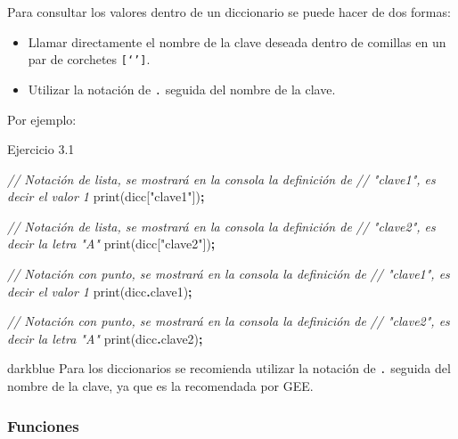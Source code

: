 \documentclass[
  12pt,
  letterpaper,
  twoside]{book}
\newenvironment{Shaded}{\begin{snugshade}}{\end{snugshade}}
\newcommand{\AttributeTok}[1]{\textcolor[rgb]{0.77,0.63,0.00}{#1}}
\newcommand{\CommentTok}[1]{\textcolor[rgb]{0.56,0.35,0.01}{\textit{#1}}}
\newcommand{\FunctionTok}[1]{\textcolor[rgb]{0.00,0.00,0.00}{#1}}
\newcommand{\NormalTok}[1]{#1}
\newcommand{\OperatorTok}[1]{\textcolor[rgb]{0.81,0.36,0.00}{\textbf{#1}}}
\newcommand{\StringTok}[1]{\textcolor[rgb]{0.31,0.60,0.02}{#1}}
\providecommand{\tightlist}{%
  \setlength{\itemsep}{0pt}\setlength{\parskip}{0pt}}
\begin{document}
Para consultar los valores dentro de un diccionario se puede hacer de dos formas:

\begin{itemize}
\tightlist
\item
  Llamar directamente el nombre de la clave deseada dentro de comillas en un par de corchetes \texttt{{[}‘’{]}}.
\item
  Utilizar la notación de \texttt{.} seguida del nombre de la clave.
\end{itemize}

Por ejemplo:

Ejercicio 3.1

\begin{Shaded}
\begin{Highlighting}[]
\CommentTok{// Notación de lista, se mostrará en la consola la definición de }
\CommentTok{// "clave1", es decir el valor 1 }
\FunctionTok{print}\NormalTok{(dicc[}\StringTok{"clave1"}\NormalTok{])}\OperatorTok{;} 

\CommentTok{// Notación de lista, se mostrará en la consola la definición de }
\CommentTok{// "clave2", es decir la letra "A"}
\FunctionTok{print}\NormalTok{(dicc[}\StringTok{"clave2"}\NormalTok{])}\OperatorTok{;}  

\CommentTok{// Notación con punto, se mostrará en la consola la definición de }
\CommentTok{// "clave1", es decir el valor 1 }
\FunctionTok{print}\NormalTok{(dicc}\OperatorTok{.}\AttributeTok{clave1}\NormalTok{)}\OperatorTok{;}  

\CommentTok{// Notación con punto, se mostrará en la consola la definición de }
\CommentTok{// "clave2", es decir la letra "A"}
\FunctionTok{print}\NormalTok{(dicc}\OperatorTok{.}\AttributeTok{clave2}\NormalTok{)}\OperatorTok{;}  
\end{Highlighting}
\end{Shaded}

\begin{bluebox2}

\begin{awesomeblock}{5pt}{\faLightbulb}{darkblue}
Para los diccionarios se recomienda utilizar la notación de \texttt{.} seguida del nombre de la clave, ya que es la recomendada por GEE.

\end{awesomeblock}

\end{bluebox2}

\hypertarget{funciones}{%
\subsubsection*{Funciones}\label{funciones}}
\end{document}
